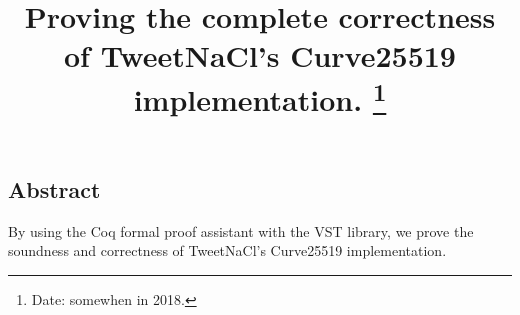 \documentclass[letterpaper,twocolumn,10pt]{article}
\newif\ifpublic
\begin{document}
\date{}

\title{\Large \bf Proving the complete correctness of TweetNaCl's Curve25519 implementation.%
\thanks{
Date: somewhen in 2018.}
}

\ifpublic
\author{
{\rm Peter Schwabe}\\
  Digital Security Group, Radboud University, The Netherlands\\
\and
{\rm Beno\^it Viguier}\\
  Digital Security Group, Radboud University, The Netherlands\\
}
\fi


\maketitle


\subsection*{Abstract}
By using the Coq formal proof assistant with the VST library, we prove the
soundness and correctness of TweetNaCl's Curve25519 implementation.

%

\vspace*{1cm}
{\footnotesize 
}

\begin{appendix}
\end{appendix}
\end{document}
